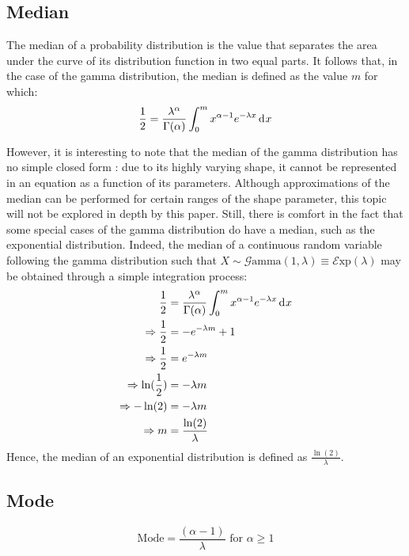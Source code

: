 \documentclass[12pt]{article}
\newcommand{\G}{\mathcal{G}}
\newcommand{\E}{\mathcal{E}}
\begin{document}
\subsection{Median}
The median of a probability distribution is the value that separates the area under the curve of its distribution
function in two equal parts. It follows that, in the case of the gamma distribution, the median is defined as the value
$m$ for which:
\begin{equation*}
	\frac{1}{2} = \frac{\lambda^\alpha}{\Gamma(\alpha)} \int^m_0 x^{\alpha-1} e^{-\lambda x}\mathop{}\!\mathrm{d^{}}x
\end{equation*}

However, it is interesting to note that the median of the gamma distribution has no simple closed form : due to its
highly varying shape, it cannot be represented in an equation as a function of its parameters. Although approximations
of the median can be performed for certain ranges of the shape parameter, this topic will not be explored in depth by
this paper. Still, there is comfort in the fact that some special cases of the gamma distribution do have a median, such
as the exponential distribution. Indeed, the median of a continuous random variable following the gamma distribution
such that $X\sim\G\text{amma}(1, \lambda)\equiv\E\text{xp}(\lambda)$ may be obtained through a simple integration
process:
\begin{equation*}
	\begin{split}
		\frac{1}{2}					&=	\frac{\lambda^\alpha}{\Gamma(\alpha)} \int^m_0 x^{\alpha-1} e^{-\lambda x}\mathop{}\!\mathrm{d^{}}x\\
		\Rightarrow\frac{1}{2}		&=	-e^{-\lambda m} + 1\\
		\Rightarrow\frac{1}{2}		&=	e^{-\lambda m}\\
		\Rightarrow\ln(\frac{1}{2})	&=	-\lambda m\\
		\Rightarrow-\ln(2)			&=	-\lambda m\\
		\Rightarrow m				&=	\frac{\ln(2)}{\lambda}
	\end{split}
\end{equation*}
Hence, the median of an exponential distribution is defined as $\frac{\ln(2)}{\lambda}$.

\subsection{Mode}
\begin{equation*}\label{eq:gamma-mode-2}
	\text{Mode} = \frac{(\alpha-1)}{\lambda}\text{ for }\alpha \geq 1
\end{equation*}
\end{document}
